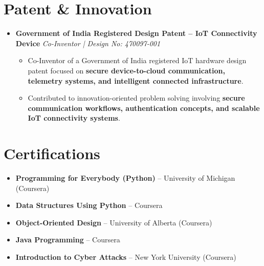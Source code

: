 \documentclass[a4paper,11pt]{article}
\newcommand{\resumeItem}[1]{
\item \small{#1 \vspace{-2pt}}
}
\begin{document}

\section{Patent \& Innovation}

\begin{itemize}[leftmargin=0in, label={}]

\item
\textbf{Government of India Registered Design Patent -- IoT Connectivity Device}
\hfill \textit{Co-Inventor | Design No: 470097-001}

\begin{itemize}[leftmargin=*]

\resumeItem{Co-Inventor of a Government of India registered IoT hardware design patent focused on \textbf{secure device-to-cloud communication, telemetry systems, and intelligent connected infrastructure}.}

\resumeItem{Contributed to innovation-oriented problem solving involving \textbf{secure communication workflows, authentication concepts, and scalable IoT connectivity systems}.}

\end{itemize}

\end{itemize}

\vspace{-10pt}




\section{Certifications}

\begin{itemize}[leftmargin=*]

\resumeItem{\textbf{Programming for Everybody (Python)} -- University of Michigan (Coursera)}

\resumeItem{\textbf{Data Structures Using Python} -- Coursera}

\resumeItem{\textbf{Object-Oriented Design} -- University of Alberta (Coursera)}

\resumeItem{\textbf{Java Programming} -- Coursera}

\resumeItem{\textbf{Introduction to Cyber Attacks} -- New York University (Coursera)}

\end{itemize}

\vspace{-10pt}
\end{document}

